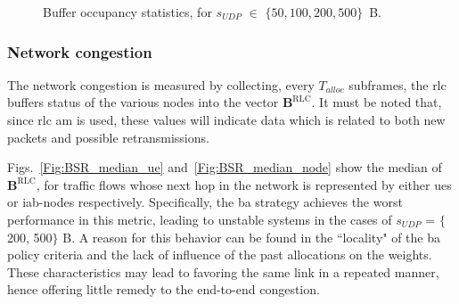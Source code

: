 \begin{figure}[tbp]
\centering
   \caption{Buffer occupancy statistics, for $s_{UDP}$ $\in$ $\{50, 100, 200, 500 \}$~B.}
  \label{Fig:BSR_median}
    \vspace{-.6cm} 
\end{figure}

\subsubsection{Network congestion}

The network congestion is measured by collecting, every $T_{alloc}$ subframes, the \gls{rlc} buffers status of the various nodes into the vector $\mathbf{B}^{\mathrm{RLC}}$. It must be noted that, since \gls{rlc} \gls{am} is used, these values will indicate data which is related to both new packets and possible retransmissions.

Figs.~\ref{Fig:BSR_median_ue} and~\ref{Fig:BSR_median_node} show the median of $\mathbf{B}^{\mathrm{RLC}}$, for traffic flows whose next hop in the network is represented by either \glspl{ue} or \gls{iab}-nodes respectively. Specifically, the \gls{ba} strategy achieves the worst performance in this metric, leading to unstable systems in the cases of $s_{UDP}$ = $\{$200, 500$\}$ B. 
A reason for this behavior can be found in the ``locality" of the \gls{ba} policy criteria and the lack of influence of the past allocations on the weights. These characteristics may lead to favoring the same link in a repeated manner, hence offering little remedy to the end-to-end congestion.

